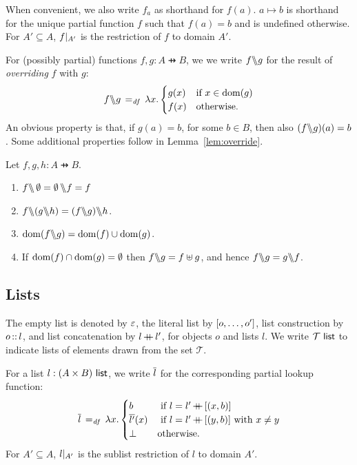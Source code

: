 \documentclass[11pt]{report}
\begin{document}
 When convenient, we also write $f_a$ as shorthand for $f(a)$. $a \mapsto b$ is shorthand for the unique partial function $f$ such that $f(a) = b$ and is undefined otherwise. For $A' \subseteq A$, $f |_{A'}$ is the restriction of $f$ to domain $A'$. 

For (possibly partial) functions $f,g : A \pfun B$, we we write $f \backslash\!\!\backslash g$ for the result of \emph{overriding} $f$ with $g$: \[ f \backslash\!\!\backslash g \operatorname{\;=_{\mathit{df}}\;} \lambda x . \begin{cases}
	g(x) & \text{if $x \in \operatorname{\mathrm{dom}}(g)$} \\
	f(x) & \text{otherwise.}
\end{cases} \] An obvious property is that, if $g(a) = b$, for some $b \in B$, then also $(f \backslash\!\!\backslash g)(a) = b$. Some additional properties follow in Lemma~\ref{lem:override}. 

\begin{lemma}
    \label{lem:override}
    Let $f,g,h : A \pfun B$. 
    \begin{enumerate}
        \item $f \backslash\!\!\backslash \operatorname{\emptyset} = \operatorname{\emptyset} \backslash\!\!\backslash f = f$
        \item $f \override (g \override h) = (f \override g) \override h$. 
        \item $\operatorname{\mathrm{dom}}(f \backslash\!\!\backslash g) = \operatorname{\mathrm{dom}}(f) \cup \operatorname{\mathrm{dom}}(g)$. 
        \item If $\operatorname{\mathrm{dom}}(f) \cap \operatorname{\mathrm{dom}}(g) = \operatorname{\emptyset}$ then $f \backslash\!\!\backslash g = f \uplus g$, and hence $f \backslash\!\!\backslash g = g \backslash\!\!\backslash f$. 
    \end{enumerate}
\end{lemma}

\subsection{Lists}
\label{sec:lists}

The empty list is denoted by $\varepsilon$, the literal list by $\left[o,\ldots, o'\right]$, list construction by $o \operatorname{:\!:} l$, and list concatenation by $l \operatorname{+\!\!\!+} l'$, for objects $o$ and lists $l$. We write $\mathcal{T}~\mathsf{list}$ to indicate lists of elements drawn from the set $\mathcal{T}$. 

For a list $l : (A \times B)~\mathsf{list}$, we write $\overline{l}$ for the corresponding partial lookup function: \[ \overline{l} \operatorname{\;=_{\mathit{df}}\;} \lambda x .\begin{cases}
	b &\text{ if $l = l' \operatorname{+\!\!\!+} \left[(x,b)\right]$}\\
	\overline{l'}(x) &\text{ if $l = l' \operatorname{+\!\!\!+} \left[(y,b)\right]$ with $x \neq y$}\\
	\bot & \text{otherwise.}
\end{cases}\] For $A' \subseteq A$, $l |_{A'}$ is the sublist restriction of $l$ to domain $A'$.
\end{document}
